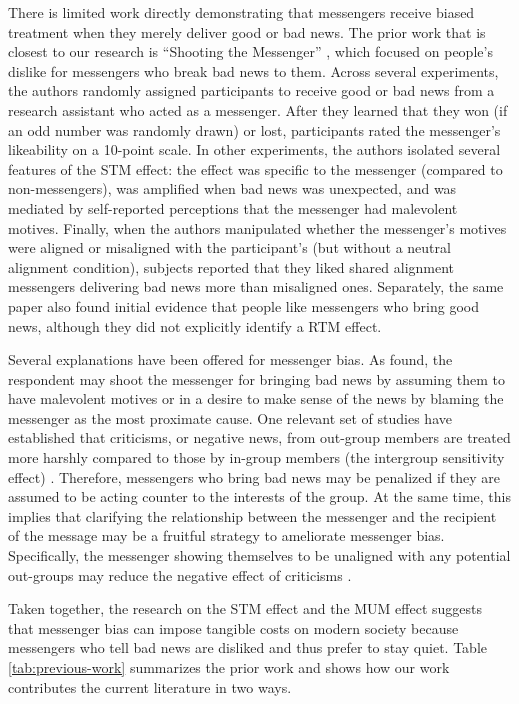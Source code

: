 There is limited work directly demonstrating that messengers receive
biased treatment when they merely deliver good or bad news. The prior
work that is closest to our research is ``Shooting the Messenger''
\citep{john2019shooting}, which focused on people's dislike for messengers
who break bad news to them. Across several experiments, the authors
randomly assigned participants to receive good or bad news from a
research assistant who acted as a messenger. After they learned that
they won (if an odd number was randomly drawn) or lost, participants
rated the messenger's likeability on a 10-point scale. In other
experiments, the authors isolated several features of the STM effect:
the effect was specific to the messenger (compared to non-messengers),
was amplified when bad news was unexpected, and was mediated by
self-reported perceptions that the messenger had malevolent motives.
Finally, when the authors manipulated whether the messenger's motives
were aligned or misaligned with the participant's (but without a neutral
alignment condition), subjects reported that they liked shared alignment
messengers delivering bad news more than misaligned ones. Separately,
the same paper also found initial evidence that people like messengers
who bring good news, although they did not explicitly identify a RTM
effect.

Several explanations have been offered for messenger bias. As \citet{john2019shooting}
 found, the respondent may shoot the messenger for bringing
bad news by assuming them to have malevolent motives or in a desire to
make sense of the news by blaming the messenger as the most proximate
cause. One relevant set of studies have established that criticisms, or
negative news, from out-group members are treated more harshly compared
to those by in-group members (the intergroup sensitivity effect)
\citep{hornsey2002it,esposo2013shooting}. Therefore, messengers who
bring bad news may be penalized if they are assumed to be acting counter
to the interests of the group. At the same time, this implies that
clarifying the relationship between the messenger and the recipient of
the message may be a fruitful strategy to ameliorate messenger bias.
Specifically, the messenger showing themselves to be unaligned with any
potential out-groups may reduce the negative effect of criticisms
\citep{hornsey2007groupdirected}.




Taken together, the research on the STM effect and the MUM effect
suggests that messenger bias can impose tangible costs on modern society
because messengers who tell bad news are disliked and thus prefer to
stay quiet. Table \ref{tab:previous-work} summarizes the prior work and shows how our work
contributes the current literature in two ways.


